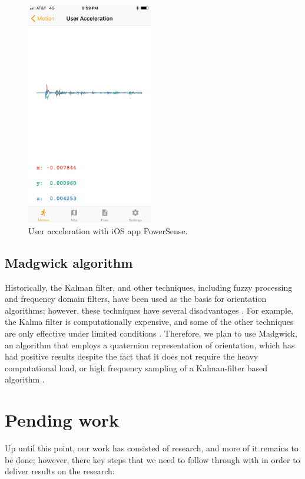 \documentclass[journal]{IEEEtranTIE}
\begin{document}
\begin{figure}[!t]\centering
	\includegraphics[width=5.5cm]{acceleration}
	\caption{User acceleration with iOS app PowerSense.}\label{fig:fig2}
\end{figure}

\subsection{Madgwick algorithm}

Historically, the Kalman filter, and other techniques, including fuzzy
processing and frequency domain filters, have been used as the basis for
orientation algorithms; however, these techniques have several disadvantages
\cite{Madgwick}. For example, the Kalma filter is computationally expensive,
and some of the other techniques are only effective under limited conditions
\cite{Madgwick}. Therefore, we plan to use Madgwick, an algorithm that employs a
quaternion representation of orientation, which has had positive results despite
the fact that it does not require the heavy computational load, or high
frequency sampling of a Kalman-filter based algorithm \cite{Madgwick}.

\section{Pending work}

Up until this point, our work has consisted of research, and more of it
remains to be done; however, there key steps that we need to follow through
with in order to deliver results on the research:
\end{document}
